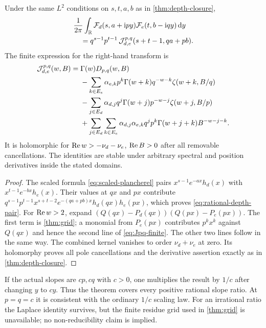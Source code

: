 \begin{theorem}
\label{thm:rational-depth}
Under the same $L^2$ conditions on $s,t,a,b$ as in
\cref{thm:depth-closure},
\begin{align}
 &\frac1{2\pi}\int_{\mathbb R}\mathcal F_d(s,a+\mathrm i py)
                              \mathcal F_e(t,b-\mathrm i qy)\,\mathrm d y\notag\\
 &\quad=q^{s-1}p^{t-1}\,
       \mathcal J_{d,e}^{p,q}(s+t-1,qa+pb).
                          \label{eq:rational-depth-pair}
\end{align}
The finite expression for the right-hand transform is
\begin{align}
 \mathcal J_{d,e}^{p,q}(w,B)={}&\Gamma(w)D_{p,q}(w,B)\notag\\
 &-\sum_{k\in E_e}\alpha_{e,k}p^k\Gamma(w+k)q^{-w-k}
                                 \zeta(w+k,B/q)\notag\\
 &-\sum_{j\in E_d}\alpha_{d,j}q^j\Gamma(w+j)p^{-w-j}
                                 \zeta(w+j,B/p)\notag\\
 &+\sum_{j\in E_d}\sum_{k\in E_e}
       \alpha_{d,j}\alpha_{e,k}q^jp^k\Gamma(w+j+k)B^{-w-j-k}.
                          \label{eq:Jpq-finite}
\end{align}
It is holomorphic for $\operatorname{Re} w>-\nu_d-\nu_e$, $\operatorname{Re} B>0$ after all
removable cancellations. The identities are stable under arbitrary
spectral and position derivatives inside the stated domains.
\end{theorem}
\begin{proof}
The scaled formula \eqref{eq:scaled-plancherel} pairs
$x^{s-1}e^{-ax}h_d(x)$ with $x^{t-1}e^{-bx}h_e(x)$.
Their values at $qx$ and $px$ contribute
$q^{s-1}p^{t-1}x^{s+t-2}e^{-(qa+pb)x}h_d(qx)h_e(px)$,
which proves \eqref{eq:rational-depth-pair}.
For $\operatorname{Re} w>2$, expand
$(Q(qx)-P_d(qx))(Q(px)-P_e(px))$.
The first term is \cref{thm:grid}; a monomial from $P_e(px)$ contributes
$p^kx^k$ against $Q(qx)$ and hence the second line of
\eqref{eq:Jpq-finite}. The other two lines follow in the same way.
The combined kernel vanishes to order $\nu_d+\nu_e$ at zero.
Its holomorphy proves all pole cancellations and the derivative assertion
exactly as in \cref{thm:depth-closure}.
\end{proof}

If the actual slopes are $cp,cq$ with $c>0$, one multiplies the result
by $1/c$ after changing $y$ to $cy$. Thus the theorem covers every positive
rational slope ratio. At $p=q=c$ it is consistent with the ordinary
$1/c$ scaling law. For an irrational ratio the Laplace identity survives,
but the finite residue grid used in \cref{thm:grid} is unavailable; no
non-reducibility claim is implied.

